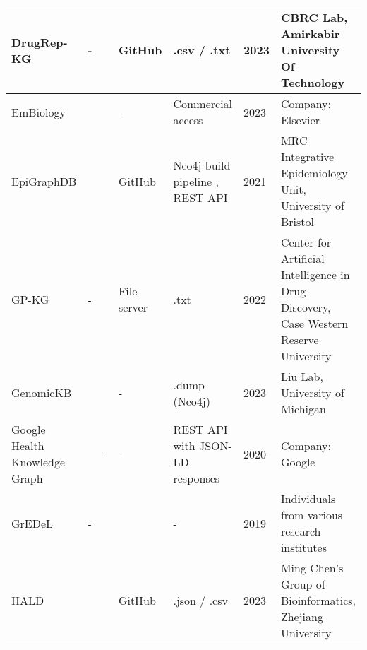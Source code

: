 \documentclass{article}
\begin{document}
\begin{landscape}
\begin{xltabular}{\textwidth}{p{3cm}|p{2.2cm}|p{2.2cm}|p{2.2cm}|p{2.2cm}|p{1cm}|p{6cm}}
\hline


DrugRep-KG
&
-
&
\cite{drugrepkg_publication}
&
GitHub
\cite{drugrepkg_github}
&
.csv / .txt
\cite{drugrepkg_data}
&
2023
&
CBRC Lab, Amirkabir University Of Technology
\cite{drugrepkg_group}
\\


\hline


EmBiology
&
\cite{embiology_website}
&
\cite{embiology_publication}
&
-
&
Commercial access
&
2023
&
Company: Elsevier
\cite{embiology_group}
\\


\hline


EpiGraphDB
&
\cite{epigraphdb_website}
&
\cite{epigraphdb_publication}
&
GitHub
\cite{epigraphdb_github1}
\cite{epigraphdb_github2}
&
Neo4j build pipeline
\cite{epigraphdb_data1},
REST API
\cite{epigraphdb_data2}
&
2021
&
MRC Integrative Epidemiology Unit, University of Bristol
\cite{epigraphdb_group}
\\


\hline


GP-KG
&
-
&
\cite{gpkg_publication}
&
File server
\cite{gpkg_software}
&
.txt
\cite{gpkg_data}
&
2022
&
Center for Artificial Intelligence in Drug Discovery, Case Western Reserve University
\cite{gpkg_group}
\\


\hline


GenomicKB
&
\cite{genomickb_website}
&
\cite{genomickb_publication}
&
-
&
.dump (Neo4j)
\cite{genomickb_data}
&
2023
&
Liu Lab, University of Michigan
\cite{genomickb_group}
\\


\hline


Google Health Knowledge Graph
&
\cite{ghkg_website1}
\cite{ghkg_website2}
&
-
&
-
&
REST API with JSON-LD responses
\cite{ghkg_data1}
\cite{ghkg_data2}
&
2020
&
Company: Google
\cite{ghkg_group}
\\


\hline


GrEDeL
&
-
&
\cite{gredel_publication}
&
\cite{gredel_github}
&
-
&
2019
&
Individuals from various research institutes
\\


\hline


HALD
&
\cite{hald_website}
&
\cite{hald_publication}
&
GitHub
\cite{hald_github}
&
.json / .csv
\cite{hald_data}
&
2023
&
Ming Chen's Group of Bioinformatics,
Zhejiang University
\cite{hald_group}
\\



\end{xltabular}
\end{landscape}
\end{document}
